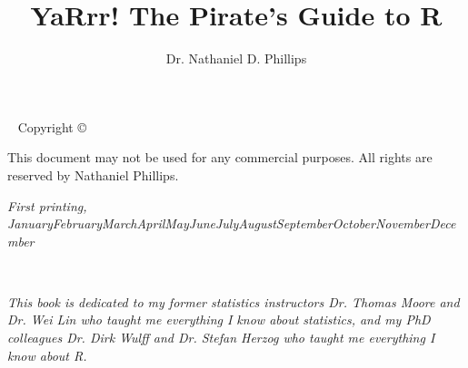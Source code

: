 \documentclass{tufte-book}\usepackage[]{graphicx}\usepackage[]{color}
\title{YaRrr! The Pirate's Guide to R}
\author{Dr. Nathaniel D. Phillips}
\newcommand{\monthyear}{\ifcase\month\or January\or February\or March\or April\or May\or June\or July\or August\or September\or October\or November\or December\fi\space\number\year} %
\begin{document}
% 


\frontmatter

\maketitle


\newpage
\begin{fullwidth}
~\vfill
\thispagestyle{empty}
\setlength{\parindent}{0pt}
\setlength{\parskip}{\baselineskip}
Copyright \copyright\ \the\year\ \thanklessauthor

\par{}

\par{}

\par This document may not be used for any commercial purposes. All rights are reserved by Nathaniel Phillips.

\par\textit{First printing, \monthyear}
\end{fullwidth}


\tableofcontents %






\cleardoublepage
~\vfill
\begin{doublespace}
\noindent\fontsize{18}{22}\selectfont\itshape
\nohyphenation
This book is dedicated to my former statistics instructors Dr. Thomas Moore and Dr. Wei Lin who taught me everything I know about statistics, and my PhD colleagues Dr. Dirk Wulff and Dr. Stefan Herzog who taught me everything I know about R.
\end{doublespace}
\vfill
\vfill
\end{document}
